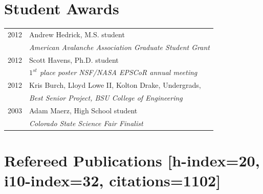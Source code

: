 \documentclass[11pt]{article}
\begin{document}
\section*{Student Awards}
\begin{tabular}{ll}
2012 & Andrew Hedrick, M.S. student \\
& \textit{American Avalanche Association Graduate Student Grant} \\
2012 & Scott Havens, Ph.D. student \\
& \textit{$1^{st}$ place poster NSF/NASA EPSCoR annual meeting} \\
2012 & Kris Burch, Lloyd Lowe II, Kolton Drake, Undergrads, \\ 
& \textit{Best Senior Project, BSU College of Engineering} \\
2003 & Adam Maerz, High School student \\
& \textit{Colorado State Science Fair Finalist}
\end{tabular}

\pagebreak

\section*{Refereed Publications \small{[h-index=20, i10-index=32, citations=1102]}}
\setlength{\extrarowheight}{10pt}
\end{document}
